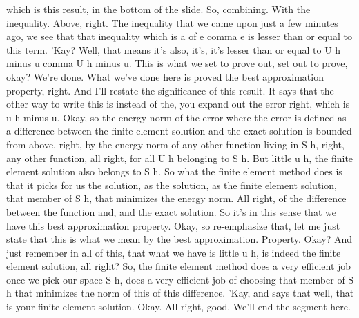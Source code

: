 \documentclass[10pt]{article}
\begin{document}
{which is this result, in the bottom of the slide. So, combining. With the inequality. Above, right. The inequality that we came upon just a few minutes ago, we see that that inequality which is a of e comma e is lesser than or equal to this term. 'Kay? Well, that means it's also, it's, it's lesser than or equal to U h minus u comma U h minus u. This is what we set to prove out, set out to prove, okay? We're done. What we've done here is proved the best approximation property, right. And I'll restate the significance of this result. It says that the other way to write this is instead of the, you expand out the error right, which is u h minus u. Okay, so the energy norm of the error where the error is defined as a difference between the finite element solution and the exact solution is bounded from above, right, by the energy norm of any other function living in S h, right, any other function, all right, for all U h belonging to S h. But little u h, the finite element solution also belongs to S h. So what the finite element method does is that it picks for us the solution, as the solution, as the finite element solution, that member of S h, that minimizes the energy norm. All right, of the difference between the function and, and the exact solution. So it's in this sense that we have this best approximation property. Okay, so re-emphasize that, let me just state that this is what we mean by the best approximation. Property. Okay? And just remember in all of this, that what we have is little u h, is indeed the finite element solution, all right? So, the finite element method does a very efficient job once we pick our space S h, does a very efficient job of choosing that member of S h that minimizes the norm of this of this difference. 'Kay, and says that well, that is your finite element solution. Okay. All right, good. We'll end the segment here.

}
\end{document}
